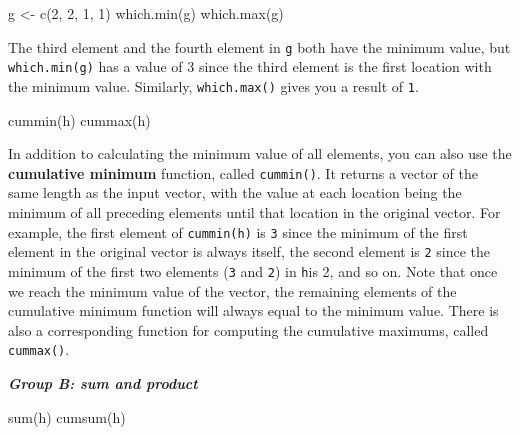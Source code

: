 \documentclass[
]{book}
\newenvironment{Shaded}{\begin{snugshade}}{\end{snugshade}}
\newcommand{\DecValTok}[1]{\textcolor[rgb]{0.00,0.00,0.81}{#1}}
\newcommand{\FunctionTok}[1]{\textcolor[rgb]{0.00,0.00,0.00}{#1}}
\newcommand{\NormalTok}[1]{#1}
\newcommand{\OtherTok}[1]{\textcolor[rgb]{0.56,0.35,0.01}{#1}}
\newenvironment{blackbox}{
  \definecolor{shadecolor}{rgb}{0, 0, 0}  %
  \color{white}
  \begin{shaded}}
 {\end{shaded}}
\newenvironment{infobox}[1]
  {
  \begin{itemize}
  \renewcommand{\labelitemi}{
    \raisebox{-.7\height}[0pt][0pt]{
      {\setkeys{Gin}{width=3em,keepaspectratio}
        \texttt{[image: pics/\#1]}}
    }
  }
  \setlength{\fboxsep}{1em}
  \begin{blackbox}
  \item
  }
  {
  \end{blackbox}
  \end{itemize}
  }
\begin{document}
\begin{infobox}{caution}

\begin{Shaded}
\begin{Highlighting}[]
\NormalTok{g }\OtherTok{\textless{}{-}} \FunctionTok{c}\NormalTok{(}\DecValTok{2}\NormalTok{, }\DecValTok{2}\NormalTok{, }\DecValTok{1}\NormalTok{, }\DecValTok{1}\NormalTok{)}
\FunctionTok{which.min}\NormalTok{(g)}
\FunctionTok{which.max}\NormalTok{(g)}
\end{Highlighting}
\end{Shaded}

The third element and the fourth element in \texttt{g} both have the minimum value, but \texttt{which.min(g)} has a value of 3 since the third element is the first location with the minimum value. Similarly, \texttt{which.max()} gives you a result of \texttt{1}.

\end{infobox}

\begin{Shaded}
\begin{Highlighting}[]
\FunctionTok{cummin}\NormalTok{(h) }
\FunctionTok{cummax}\NormalTok{(h) }
\end{Highlighting}
\end{Shaded}

In addition to calculating the minimum value of all elements, you can also use the \textbf{cumulative minimum} function, called \texttt{cummin()}. It returns a vector of the same length as the input vector, with the value at each location being the minimum of all preceding elements until that location in the original vector. For example, the first element of \texttt{cummin(h)} is \texttt{3} since the minimum of the first element in the original vector is always itself, the second element is \texttt{2} since the minimum of the first two elements (\texttt{3} and \texttt{2}) in \texttt{h}is 2, and so on. Note that once we reach the minimum value of the vector, the remaining elements of the cumulative minimum function will always equal to the minimum value. There is also a corresponding function for computing the cumulative maximums, called \texttt{cummax()}.

\textbf{\emph{Group B: sum and product}}

\begin{Shaded}
\begin{Highlighting}[]
\FunctionTok{sum}\NormalTok{(h)}
\FunctionTok{cumsum}\NormalTok{(h)}
\end{Highlighting}
\end{Shaded}
\end{document}
